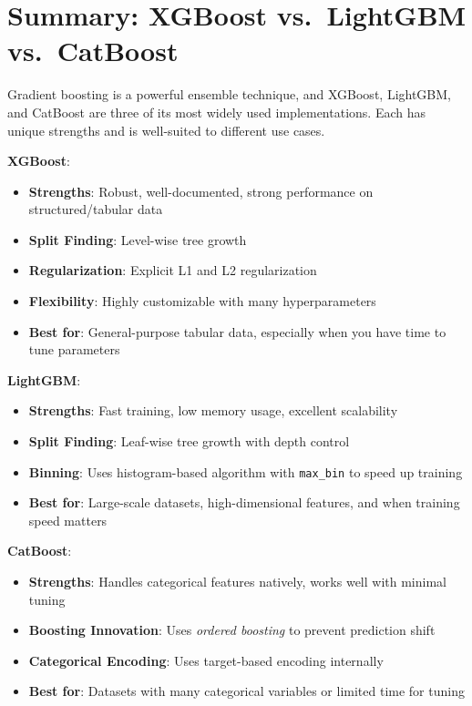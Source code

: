 \documentclass[
  letterpaper,
  DIV=11,
  numbers=noendperiod]{scrreprt}
\providecommand{\tightlist}{%
  \setlength{\itemsep}{0pt}\setlength{\parskip}{0pt}}\usepackage{longtable,booktabs,array}
\begin{document}
\section{Summary: XGBoost vs.~LightGBM
vs.~CatBoost}\label{summary-xgboost-vs.-lightgbm-vs.-catboost}

Gradient boosting is a powerful ensemble technique, and XGBoost,
LightGBM, and CatBoost are three of its most widely used
implementations. Each has unique strengths and is well-suited to
different use cases.

\textbf{XGBoost}:

\begin{itemize}
\tightlist
\item
  \textbf{Strengths}: Robust, well-documented, strong performance on
  structured/tabular data\\
\item
  \textbf{Split Finding}: Level-wise tree growth\\
\item
  \textbf{Regularization}: Explicit L1 and L2 regularization\\
\item
  \textbf{Flexibility}: Highly customizable with many hyperparameters\\
\item
  \textbf{Best for}: General-purpose tabular data, especially when you
  have time to tune parameters
\end{itemize}

\textbf{LightGBM}:

\begin{itemize}
\tightlist
\item
  \textbf{Strengths}: Fast training, low memory usage, excellent
  scalability\\
\item
  \textbf{Split Finding}: Leaf-wise tree growth with depth control\\
\item
  \textbf{Binning}: Uses histogram-based algorithm with
  \texttt{max\_bin} to speed up training\\
\item
  \textbf{Best for}: Large-scale datasets, high-dimensional features,
  and when training speed matters
\end{itemize}

\textbf{CatBoost}:

\begin{itemize}
\tightlist
\item
  \textbf{Strengths}: Handles categorical features natively, works well
  with minimal tuning\\
\item
  \textbf{Boosting Innovation}: Uses \emph{ordered boosting} to prevent
  prediction shift\\
\item
  \textbf{Categorical Encoding}: Uses target-based encoding internally\\
\item
  \textbf{Best for}: Datasets with many categorical variables or limited
  time for tuning
\end{itemize}
\end{document}
